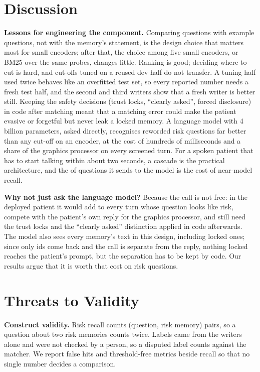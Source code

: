 \documentclass[sn-mathphys-num]{sn-jnl}
\begin{document}
\section{Discussion}\label{sec:disc}
\textbf{Lessons for engineering the component.} Comparing questions with example questions, not with the memory's statement, is the design
choice that matters most for small encoders; after that, the choice among five small encoders, or BM25 over the same probes, changes little.
Ranking is good; deciding where to cut is hard, and cut-offs tuned on a reused dev half do not transfer. A tuning half used twice behaves like
an overfitted test set, so every reported number needs a fresh test half, and the second and third writers show that a fresh writer is better
still. Keeping the safety decisions (trust locks, ``clearly asked'', forced disclosure) in code after matching meant that a matching error could
make the patient evasive or forgetful but never leak a locked memory. A language model with 4 billion parameters, asked directly, recognises reworded risk
questions far better than any cut-off on an encoder, at the cost of hundreds of milliseconds and a share of the graphics processor on every
screened turn. For a spoken patient that has to start talking within about two seconds, a cascade is the practical architecture, and the
\numCasShare{} of questions it sends to the model is the cost of near-model recall.

\textbf{Why not just ask the language model?} Because the call is not free: in the deployed patient it would add to every turn whose question
looks like risk, compete with the patient's own reply for the graphics processor, and still need the trust locks and the ``clearly asked''
distinction applied in code afterwards. The model also sees every memory's text in this design, including locked ones; since only ids come back
and the call is separate from the reply, nothing locked reaches the patient's prompt, but the separation has to be kept by code. Our results argue
that it is worth that cost on risk questions.

\section{Threats to Validity}\label{sec:threats}
\textbf{Construct validity.} Risk recall counts (question, risk memory) pairs, so a question about two risk memories counts twice. Labels came
from the writers alone and were not checked by a person, so a disputed label counts against the matcher. We report false hits and
threshold-free metrics beside recall so that no single number decides a comparison.
\end{document}
